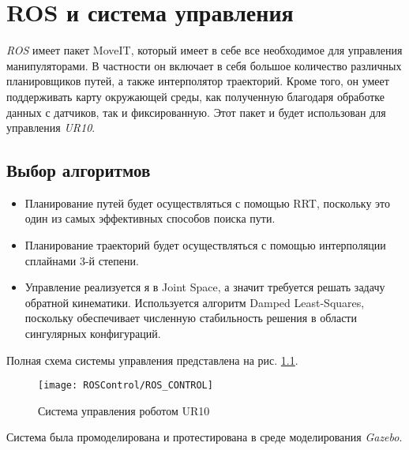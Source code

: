 \chapter{ROS и система управления}\label{ch:5}

\textit{ROS} имеет пакет MoveIT, который имеет в себе все необходимое для управления манипуляторами. В частности он включает в себя большое количество различных планировщиков путей, а также интерполятор траекторий. Кроме того, он умеет поддерживать карту окружающей среды, как полученную благодаря обработке данных с датчиков, так и фиксированную. Этот пакет и будет использован для управления \textit{UR10}.

\section{Выбор алгоритмов} \label{sect:5_1}
\begin{itemize}
	\item Планирование путей будет осуществляться с помощью RRT, поскольку это один из самых эффективных способов поиска пути.
	\item Планирование траекторий будет осуществляться с помощью интерполяции сплайнами 3-й степени.
	\item Управление реализуется я в Joint Space, а значит требуется решать задачу обратной кинематики. Используется алгоритм Damped Least-Squares, поскольку обеспечивает численную стабильность решения в области сингулярных конфигураций.
\end{itemize}
Полная схема системы управления представлена на рис. \ref{fig:5_1_1}.
\begin{figure}[h!]
	\centering
	\texttt{[image: ROSControl/ROS\_CONTROL]}
	\caption{Система управления роботом UR10}
	\label{fig:5_1_1}
\end{figure}
Система была промоделирована и протестирована в среде моделирования \textit{Gazebo}.